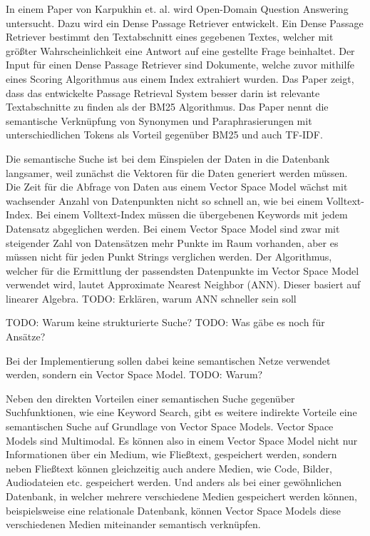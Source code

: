 In einem Paper von Karpukhin et. al. wird Open-Domain Question Answering untersucht.\cite{Karpukhin_Oguz_Min_Lewis_Wu_Edunov_Chen_Yih_2020}
Dazu wird ein Dense Passage Retriever entwickelt.
Ein Dense Passage Retriever bestimmt den Textabschnitt eines gegebenen Textes, welcher mit größter Wahrscheinlichkeit eine Antwort auf eine gestellte Frage beinhaltet.
Der Input für einen Dense Passage Retriever sind Dokumente, welche zuvor mithilfe eines Scoring Algorithmus aus einem Index extrahiert wurden.
Das Paper zeigt, dass das entwickelte Passage Retrieval System besser darin ist relevante Textabschnitte zu finden als der BM25 Algorithmus. 
Das Paper nennt die semantische Verknüpfung von Synonymen und Paraphrasierungen mit unterschiedlichen Tokens als Vorteil gegenüber BM25 und auch TF-IDF.

Die semantische Suche ist bei dem Einspielen der Daten in die Datenbank langsamer, weil zunächst die Vektoren für die Daten generiert werden müssen.
Die Zeit für die Abfrage von Daten aus einem Vector Space Model wächst mit wachsender Anzahl von Datenpunkten nicht so schnell an, wie bei einem Volltext-Index.
Bei einem Volltext-Index müssen die übergebenen Keywords mit jedem Datensatz abgeglichen werden.
Bei einem Vector Space Model sind zwar mit steigender Zahl von Datensätzen mehr Punkte im Raum vorhanden, aber es müssen nicht für jeden Punkt Strings verglichen werden.
Der Algorithmus, welcher für die Ermittlung der passendsten Datenpunkte im Vector Space Model verwendet wird, lautet Approximate Nearest Neighbor (ANN).
Dieser basiert auf linearer Algebra.
TODO: Erklären, warum ANN schneller sein soll

TODO: Warum keine strukturierte Suche?
TODO: Was gäbe es noch für Ansätze?

Bei der Implementierung sollen dabei keine semantischen Netze verwendet werden, sondern ein Vector Space Model.
TODO: Warum?

Neben den direkten Vorteilen einer semantischen Suche gegenüber Suchfunktionen, wie eine Keyword Search, gibt es weitere indirekte Vorteile eine semantischen Suche auf Grundlage von Vector Space Models.
Vector Space Models sind Multimodal.
Es können also in einem Vector Space Model nicht nur Informationen über ein Medium, wie Fließtext, gespeichert werden, sondern neben Fließtext können gleichzeitig auch andere Medien, wie Code, Bilder, Audiodateien etc. gespeichert werden.
Und anders als bei einer gewöhnlichen Datenbank, in welcher mehrere verschiedene Medien gespeichert werden können, beispielsweise eine relationale Datenbank, können Vector Space Models diese verschiedenen Medien miteinander semantisch verknüpfen.\\

